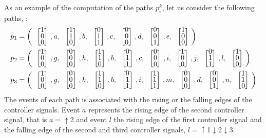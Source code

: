 \setlength\arraycolsep{2pt}
As an example of the computation of the paths $p_i^k$, let us consider the following
paths, \citep{moreira2018enhanced}:
\begin{align*}
  p_1&= \left(\colvec{1\\0\\0},a,\colvec{1\\1\\0},b,\colvec{0\\1\\1},c,\colvec{0\\0\\0},d,\colvec{0\\0\\1},e,\colvec{1\\0\\0}\right) \\
  p_2&= \left(\colvec{1\\0\\0},g,\colvec{0\\0\\0},h,\colvec{1\\1\\0},b,\colvec{0\\1\\1},c,\colvec{0\\0\\0},i,\colvec{1\\0\\0},j,\colvec{0\\1\\1},l,\colvec{1\\0\\0}\right) \\
  p_3&= \left(\colvec{1\\0\\0},g,\colvec{0\\0\\0},h,\colvec{1\\1\\0},b,\colvec{0\\1\\1},i,\colvec{1\\1\\1},m,\colvec{0\\0\\0},d,\colvec{0\\0\\1},n,\colvec{1\\1\\0}\right) \\
\end{align*}
The events of each path is associated with the rising or the falling edges of
the controller signals. Event $a$ represents the rising edge of the second
controller signal, that is $a=\uparrow$2 and event $l$ the rising edge of the first
controller signal and the falling edge of the second
and third controller signals, $l=\uparrow$1$\downarrow$2$\downarrow$3.

